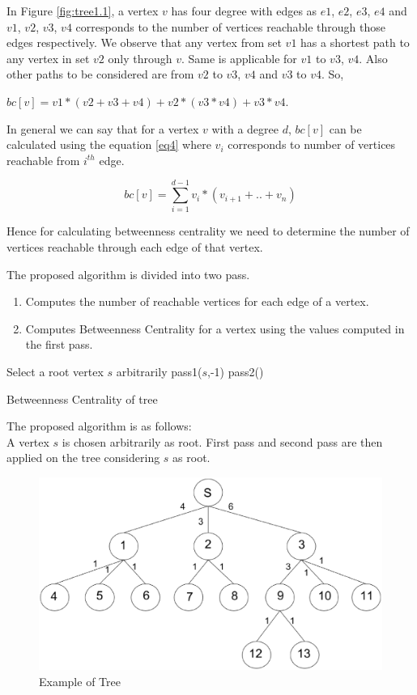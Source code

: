 In Figure \ref{fig:tree1.1}, a vertex $v$ has four degree with edges as $e1$, $e2$, $e3$, $e4$ and $v1$, $v2$, $v3$, $v4$ corresponds to the number of vertices reachable through those edges respectively. We observe that any vertex from set $v1$ has a shortest path to any vertex in set $v2$ only through $v$. Same is applicable for $v1$ to $v3$, $v4$. Also other paths to be considered are from $v2$ to $v3$, $v4$ and $v3$ to $v4$.
So,

$bc[v] = v1*(v2+v3+v4) + v2*(v3*v4) + v3*v4$.

In general we can say that for a vertex $v$ with a degree $d$, $bc[v]$ can be calculated using the equation \ref{eq4} where $v_{i}$ corresponds to number of vertices reachable from $i_{}^{th}$ edge.

\begin{equation} \label{eq4}
bc[v] = \sum_{i=1}^{d-1} v_{i}*(v_{i+1}+..+v_{n})
\end{equation}

Hence for calculating betweenness centrality we need to determine the number of vertices reachable through each edge of that vertex.

The proposed algorithm is divided into two pass.
\vspace{-0.5em}
\begin{enumerate}

  \item Computes the number of reachable vertices for each edge of a vertex.
  \item Computes Betweenness Centrality for a vertex using the values computed in the first pass.
\end{enumerate}
\begin{algorithm}

Select a root vertex $s$ arbitrarily\;
pass1($s$,-1)\;
pass2()\;
\caption{Betweenness Centrality of tree}
\label{treealgofull}
\end{algorithm}


\hspace{-1.5em}The proposed algorithm is as follows:
\\
A vertex $s$ is chosen arbitrarily as root. First pass and second pass are then applied on the tree considering $s$ as root.

\begin{figure}[htp]
\centering
\includegraphics[width=13cm]{images/exampletree.eps}
\caption{Example of Tree}
\label{fig:extree}
\end{figure}

